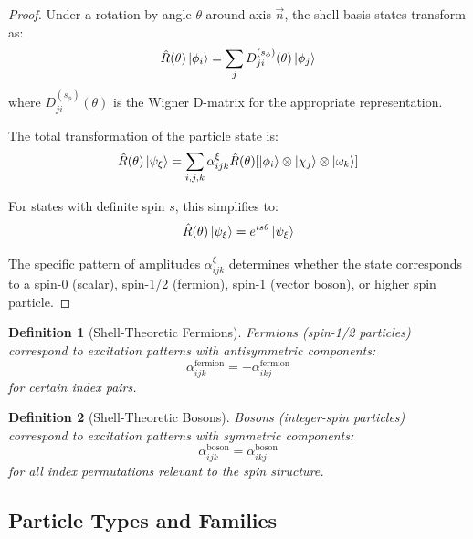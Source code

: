 \documentclass[12pt,a4paper]{article}
\newtheorem{definition}{Definition}[section]
\begin{document}
\begin{proof}
Under a rotation by angle $\theta$ around axis $\vec{n}$, the shell basis states transform as:
\begin{equation}
\hat{R}(\theta) \ket{\phi_i} = \sum_j D_{ji}^{(s_{\phi})}(\theta) \ket{\phi_j}
\end{equation}
where $D_{ji}^{(s_{\phi})}(\theta)$ is the Wigner D-matrix for the appropriate representation.

The total transformation of the particle state is:
\begin{equation}
\hat{R}(\theta) \ket{\psi_{\xi}} = \sum_{i,j,k} \alpha_{ijk}^{\xi} \hat{R}(\theta)[\ket{\phi_i} \otimes \ket{\chi_j} \otimes \ket{\omega_k}]
\end{equation}

For states with definite spin $s$, this simplifies to:
\begin{equation}
\hat{R}(\theta) \ket{\psi_{\xi}} = e^{is\theta} \ket{\psi_{\xi}}
\end{equation}

The specific pattern of amplitudes $\alpha_{ijk}^{\xi}$ determines whether the state corresponds to a spin-0 (scalar), spin-1/2 (fermion), spin-1 (vector boson), or higher spin particle.
\end{proof}

\begin{definition}[Shell-Theoretic Fermions]
\label{def:fermions}
Fermions (spin-1/2 particles) correspond to excitation patterns with antisymmetric components:
\begin{equation}
\alpha_{ijk}^{\text{fermion}} = -\alpha_{ikj}^{\text{fermion}}
\end{equation}
for certain index pairs.
\end{definition}

\begin{definition}[Shell-Theoretic Bosons]
\label{def:bosons}
Bosons (integer-spin particles) correspond to excitation patterns with symmetric components:
\begin{equation}
\alpha_{ijk}^{\text{boson}} = \alpha_{ikj}^{\text{boson}}
\end{equation}
for all index permutations relevant to the spin structure.
\end{definition}

\subsection{Particle Types and Families}
\label{subsec:particle-families}
\end{document}

